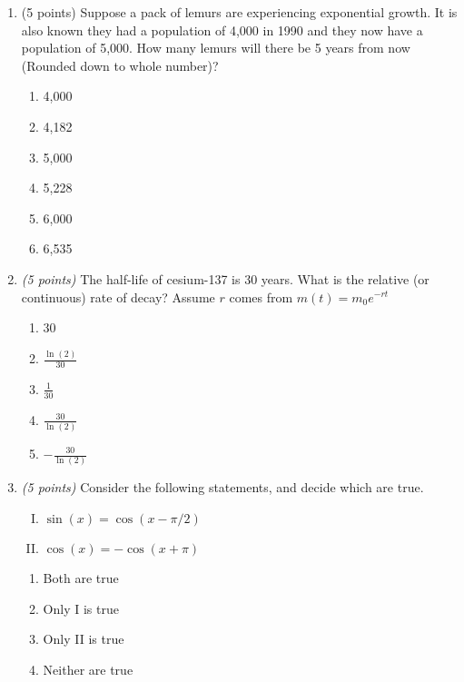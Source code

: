\documentclass[fleqn]{article}
\begin{document}
\begin{enumerate}
\item (5 points) Suppose a pack of lemurs are experiencing exponential growth.  It is also known they had a population of 4,000 in 1990 and they now have a population of 5,000.  How many lemurs will there be 5 years from now (Rounded down to whole number)?
\begin{multicols}{3}
\begin{enumerate}
\item 4,000
\item 4,182
\item 5,000
\item 5,228
\item 6,000
\item 6,535
\end{enumerate}
\end{multicols}

\vspace{0.3in}

\item \textit{(5 points)} The half-life of cesium-137 is 30 years.  What is the relative (or continuous) rate of decay?  Assume $r$ comes from $m(t) = m_0 e^{-rt}$
\begin{enumerate}
\item 30
\item $\frac{\ln(2)}{30}$
\item $\frac{1}{30}$
\item $\frac{30}{\ln(2)}$
\item $-\frac{30}{\ln(2)}$
\end{enumerate}

\vspace{0.3in}

\item \textit{(5 points)} Consider the following statements, and decide which are true.
\begin{multicols}{2}
\begin{enumerate}[I.]
\item $\sin(x) = \cos(x - \pi/2)$
\item $\cos(x) = -\cos(x + \pi)$
\end{enumerate}
\end{multicols}
\begin{multicols}{3}
\begin{enumerate}
\item Both are true
\item Only I is true
\item Only II is true
\item Neither are true
\end{enumerate}
\end{multicols}


\end{enumerate}
\end{document}
